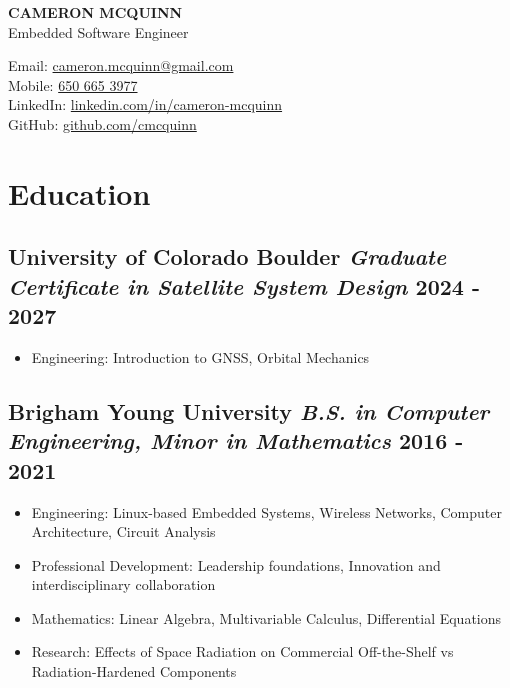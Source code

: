 \documentclass[11pt]{article} %
\begin{document}
\begin{center}
	\begin{minipage}{0.5\textwidth}
		{\LARGE\bfseries
			CAMERON MCQUINN
		} \\ \medskip
		Embedded Software Engineer %
	\end{minipage} \hfill
	\begin{minipage}{0.4\textwidth}
		\raggedleft
		Email: \href{mailto:cameron.mcquinn@gmail.com}{cameron.mcquinn@gmail.com} \\
		Mobile: \href{tel:+16506653977}{650 665 3977} \\
		LinkedIn: \href{https://www.linkedin.com/in/cameron-mcquinn}{linkedin.com/in/cameron-mcquinn} \\
		GitHub: \href{https://github.com/cmcquinn}{github.com/cmcquinn}
	\end{minipage}
\end{center}

\section{Education}
\subsection{University of Colorado Boulder \textbar{} {\normalfont\itshape Graduate Certificate in Satellite System Design} \hfill 2024 - 2027}
\begin{itemize}
  \item Engineering: Introduction to GNSS, Orbital Mechanics
\end{itemize}
\subsection{Brigham Young University \textbar{} {\normalfont\itshape B.S. in Computer Engineering, Minor in Mathematics} \hfill 2016 - 2021}
\begin{itemize}
  \item Engineering: Linux-based Embedded Systems, Wireless Networks, Computer Architecture, Circuit Analysis
  \item Professional Development: Leadership foundations, Innovation and interdisciplinary collaboration
  \item Mathematics: Linear Algebra, Multivariable Calculus, Differential Equations
  \item Research: Effects of Space Radiation on Commercial Off-the-Shelf vs Radiation-Hardened Components
\end{itemize}
\end{document}
